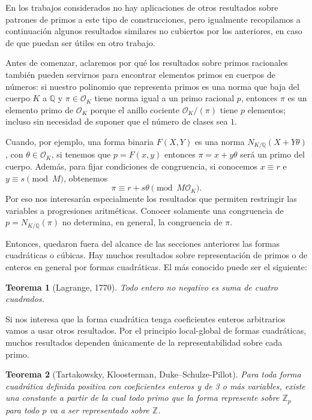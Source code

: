 \documentclass[a4paper]{book}
\theoremstyle{definition}
\theoremstyle{plain}
\newtheorem*{theorem*}{Teorema}
\newcommand{\QQ}{\mathbb{Q}}
\newcommand{\ZZ}{\mathbb{Z}}
\newcommand{\OO}{\mathcal{O}}
\begin{document}
En los trabajos considerados no hay aplicaciones de otros resultados sobre patrones de primos a este tipo de construcciones, pero igualmente recopilamos a continuación algunos resultados similares no cubiertos por los anteriores, en caso de que puedan ser útiles en otro trabajo.

Antes de comenzar, aclaremos por qué los resultados sobre primos racionales también pueden servirnos para encontrar elementos primos en cuerpos de números: si nuestro polinomio que representa primos es una norma que baja del cuerpo $K$ a $\QQ$ y $\pi\in\OO_K$ tiene norma igual a un primo racional $p$, entonces $\pi$ es un elemento primo de $\OO_K$ porque el anillo cociente $\OO_K/(\pi)$ tiene $p$ elementos; incluso sin necesidad de suponer que el número de clases sea $1$.

Cuando, por ejemplo, una forma binaria $F(X,Y)$ es una norma $N_{K/\QQ}(X+Y\theta)$, con $\theta\in\OO_K$, si tenemos que $p=F(x,y)$ entonces $\pi=x+y\theta$ será un primo del cuerpo. Además, para fijar condiciones de congruencia, si conocemos $x\equiv r$ e $y\equiv s\pmod M$, obtenemos
\[
\pi\equiv r+s\theta\pmod{M\OO_K}.
\]
Por eso nos interesarán especialmente los resultados que permiten restringir las variables a progresiones aritméticas. Conocer solamente una congruencia de $p=N_{K/\QQ}(\pi)$ no determina, en general, la congruencia de $\pi$.



Entonces, quedaron fuera del alcance de las secciones anteriores las formas cuadráticas o cúbicas. Hay muchos resultados sobre representación de primos o de enteros en general por formas cuadráticas. El más conocido puede ser el siguiente:

\begin{theorem*}[Lagrange, 1770]
Todo entero no negativo es suma de cuatro cuadrados.
\end{theorem*}

Si nos interesa que la forma cuadrática tenga coeficientes enteros arbitrarios vamos a usar otros resultados. Por el principio local-global de formas cuadráticas, muchos resultados dependen únicamente de la representabilidad sobre cada primo. 

\begin{theorem*}[Tartakowsky, Kloosterman, Duke--Schulze-Pillot]
Para toda forma cuadrática definida positiva con coeficientes enteros y de 3 o más variables, existe una constante a partir de la cual todo primo que la forma represente sobre $\ZZ_p$ para todo $p$ va a ser representado sobre $\ZZ$.
\end{theorem*}
\end{document}
